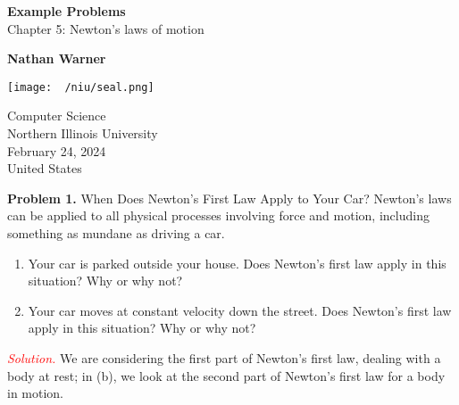 \documentclass{report}
\title{\Huge{}}
\author{\huge{Nathan Warner}}
\date{\huge{}}
\begin{document}
        \begin{titlepage}
       \begin{center}
           \vspace*{1cm}
    
           \textbf{Example Problems} \\
           Chapter 5: Newton's laws of motion
    
           \vspace{0.5cm}
            
                
           \vspace{1.5cm}
    
           \textbf{Nathan Warner}
    
           \vfill
                
                
           \vspace{0.8cm}
         
           \texttt{[image: ~/niu/seal.png]}
                
           Computer Science \\
           Northern Illinois University\\
           February 24, 2024 \\
           United States\\
           
                
       \end{center}
    \end{titlepage}
    \tableofcontents
    \pagebreak 
    \bigbreak \noindent 
    \textbf{Problem 1.} When Does Newton’s First Law Apply to Your Car?
    \bigbreak \noindent 
    Newton’s laws can be applied to all physical processes involving force and motion, including something as mundane as driving a car.
    \begin{enumerate}[label=(\alph*)]
        \item Your car is parked outside your house. Does Newton’s first law apply in this situation? Why or why not?
        \item Your car moves at constant velocity down the street. Does Newton’s first law apply in this situation? Why or why not?
    \end{enumerate}
    \bigbreak \noindent 
    \textcolor{red}{\textit{Solution.}} We are considering the first part of Newton’s first law, dealing with a body at rest; in (b), we look at the second part of Newton’s first law for a body in motion.
\end{document}
